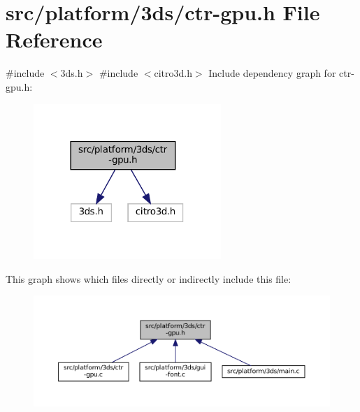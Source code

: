 \hypertarget{ctr-gpu_8h}{}\section{src/platform/3ds/ctr-\/gpu.h File Reference}
\label{ctr-gpu_8h}
{\ttfamily \#include $<$3ds.\+h$>$}\newline
{\ttfamily \#include $<$citro3d.\+h$>$}\newline
Include dependency graph for ctr-\/gpu.h\+:
\nopagebreak
\begin{figure}[H]
\begin{center}
\leavevmode
\includegraphics[width=201pt]{ctr-gpu_8h__incl}
\end{center}
\end{figure}
This graph shows which files directly or indirectly include this file\+:
\nopagebreak
\begin{figure}[H]
\begin{center}
\leavevmode
\includegraphics[width=350pt]{ctr-gpu_8h__dep__incl}
\end{center}
\end{figure}
